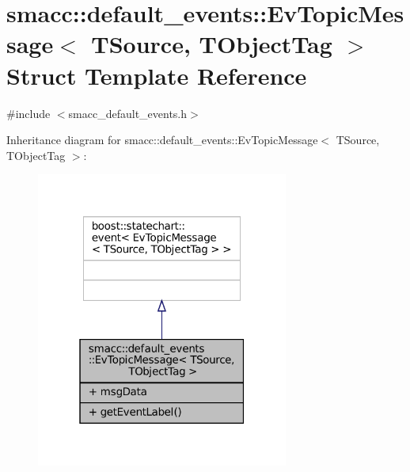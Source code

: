 \hypertarget{structsmacc_1_1default__events_1_1EvTopicMessage}{}\section{smacc\+:\+:default\+\_\+events\+:\+:Ev\+Topic\+Message$<$ T\+Source, T\+Object\+Tag $>$ Struct Template Reference}
\label{structsmacc_1_1default__events_1_1EvTopicMessage}


{\ttfamily \#include $<$smacc\+\_\+default\+\_\+events.\+h$>$}



Inheritance diagram for smacc\+:\+:default\+\_\+events\+:\+:Ev\+Topic\+Message$<$ T\+Source, T\+Object\+Tag $>$\+:
\nopagebreak
\begin{figure}[H]
\begin{center}
\leavevmode
\includegraphics[width=235pt]{structsmacc_1_1default__events_1_1EvTopicMessage__inherit__graph}
\end{center}
\end{figure}


